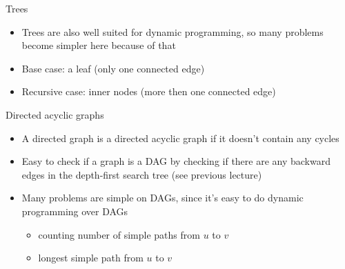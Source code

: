 \documentclass[12pt,t]{beamer}
\newcommand{\bi}{\begin{itemize}}
\newcommand{\ei}{\end{itemize}}
\begin{document}
\begin{frame}{Trees}
    \vspace{30pt}
    \bi
        \item Trees are also well suited for dynamic programming, so many problems become simpler here because of that
        \item Base case: a leaf (only one connected edge)
        \item Recursive case: inner nodes (more then one connected edge)
    \ei
\end{frame}

\begin{frame}{Directed acyclic graphs}
    \vspace{20pt}
    \bi
        \item A directed graph is a directed acyclic graph if it doesn't contain any cycles
    \vspace{10pt}
\item Easy to check if a graph is a DAG by checking if there are any backward edges in the depth-first search tree (see previous lecture)
    \vspace{10pt}
\item Many problems are simple on DAGs, since it's easy to do dynamic programming over DAGs
        \bi
            \item counting number of simple paths from $u$ to $v$
            \item longest simple path from $u$ to $v$
        \ei
    \ei
\end{frame}
\end{document}
